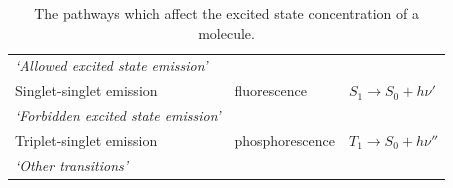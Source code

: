 \documentclass[
]{book}
\begin{document}
\begin{longtable}[]{@{}lll@{}}
\caption{\label{tab:phototrans} The pathways which affect the excited state concentration of a molecule.}\tabularnewline
\toprule
\endhead
\begin{minipage}[t]{0.35\columnwidth}\raggedright
\emph{`Allowed excited state emission'}\strut
\end{minipage} & \begin{minipage}[t]{0.33\columnwidth}\raggedright
\strut
\end{minipage} & \begin{minipage}[t]{0.23\columnwidth}\raggedright
\strut
\end{minipage}\tabularnewline
\begin{minipage}[t]{0.35\columnwidth}\raggedright
Singlet-singlet emission\strut
\end{minipage} & \begin{minipage}[t]{0.33\columnwidth}\raggedright
fluorescence\strut
\end{minipage} & \begin{minipage}[t]{0.23\columnwidth}\raggedright
\(S_1 \longrightarrow S_0 + h \nu '\)\strut
\end{minipage}\tabularnewline
\begin{minipage}[t]{0.35\columnwidth}\raggedright
\emph{`Forbidden excited state emission'}\strut
\end{minipage} & \begin{minipage}[t]{0.33\columnwidth}\raggedright
\strut
\end{minipage} & \begin{minipage}[t]{0.23\columnwidth}\raggedright
\strut
\end{minipage}\tabularnewline
\begin{minipage}[t]{0.35\columnwidth}\raggedright
Triplet-singlet emission\strut
\end{minipage} & \begin{minipage}[t]{0.33\columnwidth}\raggedright
phosphorescence\strut
\end{minipage} & \begin{minipage}[t]{0.23\columnwidth}\raggedright
\(T_1 \longrightarrow S_0 + h \nu ''\)\strut
\end{minipage}\tabularnewline
\begin{minipage}[t]{0.35\columnwidth}\raggedright
\emph{`Other transitions'}\strut
\end{minipage} & \begin{minipage}[t]{0.33\columnwidth}\raggedright

\end{minipage}
\end{longtable}
\end{document}
